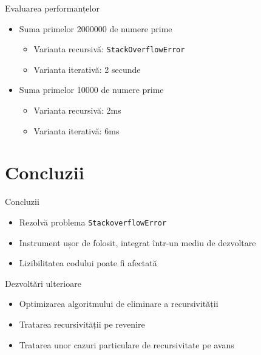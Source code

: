 \documentclass{beamer}
\def\code#1{\texttt{#1}}
\begin{document}
\begin{frame}{Evaluarea performanțelor}
    \begin{itemize}
        \item Suma primelor 2000000 de numere prime
        \begin{itemize}
            \item Varianta recursivă: \code{StackOverflowError}
            \item Varianta iterativă: 2 secunde
        \end{itemize}
        \item Suma primelor 10000 de numere prime
        \begin{itemize}
            \item Varianta recursivă: 2ms
            \item Varianta iterativă: 6ms
        \end{itemize}
    \end{itemize}
\end{frame}


\section{Concluzii}

\begin{frame}{Concluzii}
    \begin{itemize}
        \item Rezolvă problema \code{StackoverflowError}
        \item Instrument ușor de folosit, integrat într-un mediu de dezvoltare
        \item Lizibilitatea codului poate fi afectată
    \end{itemize}
\end{frame}

\begin{frame}{Dezvoltări ulterioare}
	\begin{itemize}
        \item Optimizarea algoritmului de eliminare a recursivității
		\item Tratarea recursivității pe revenire
        \item Tratarea unor cazuri particulare de recursivitate pe avans
	\end{itemize}
\end{frame}
\end{document}
